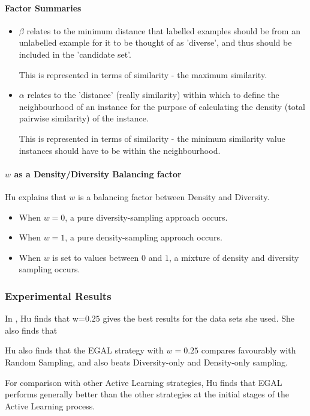 \documentclass[a4paper,11pt]{report}
\begin{document}
\paragraph{Factor Summaries}
\begin{itemize}
	\item $\beta$ relates to the minimum distance  that labelled examples should be from an unlabelled example for it to be thought of as 'diverse', and thus should be included in the 'candidate set'. 
	
	This is represented in terms of similarity - the maximum similarity.

	\item $\alpha$ relates to the 'distance' (really similarity) within which to define the neighbourhood of an instance for the purpose of calculating the density (total pairwise similarity) of the instance. 
	
	This is represented in terms of similarity - the minimum similarity value instances should have to be within the neighbourhood.
	
\end{itemize}

\paragraph{$w$ as a Density/Diversity Balancing factor}
Hu explains that $w$ is a balancing factor between Density and Diversity\cite{Hu2010}. 

\begin{itemize}
	\item When $w=0$, a pure diversity-sampling approach occurs. 
	\item When $w=1$, a pure density-sampling approach occurs. 
	\item When $w$ is set to values between $0$ and $1$, a mixture of density and diversity sampling occurs.
\end{itemize}

\subsubsection{Experimental Results}
In \citet{Hu2011}, Hu finds that w=$0.25$ gives the best results for the data sets she used. She also finds that 

Hu also finds that the EGAL strategy with $w=0.25$ compares favourably with Random Sampling, and also beats Diversity-only and Density-only sampling.

For comparison with other Active Learning strategies, Hu finds that EGAL performs generally better than the other strategies at the initial stages of the Active Learning process.
\end{document}
